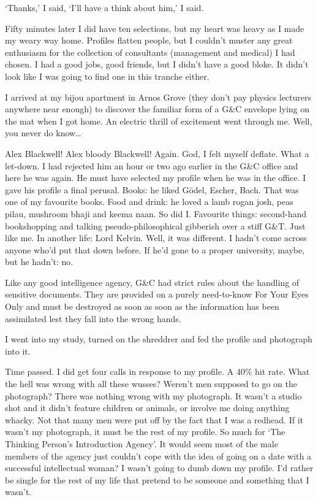 `Thanks,' I said, `I'll have a think about him,' I said.

Fifty minutes later I did have ten selections, but my heart was
heavy as I made my weary way home. Profiles flatten people, but I
couldn't muster any great enthusiasm for the collection of
consultants (management and medical) I had chosen. I had a good jobs,
good friends, but I didn't have a good bloke. It didn't look like I
was going to find one in this tranche either.

I arrived at my bijou apartment in Arnos Grove (they don't pay
physics lecturers anywhere near enough) to discover the familiar
form of a G{\&}C envelope lying on the mat when I got home. An
electric thrill of excitement went through me. Well, you never do
know\dots

Alex Blackwell! Alex bloody Blackwell! Again. God, I felt myself
deflate. What a let-down. I had rejected him an hour or two ago
earlier in the G{\&}C office and here he was again. He must have selected my profile when he was in the office. I gave his
profile a final perusal. Books: he liked {\twelvesl Gödel,
Escher, Bach.}  That was one of my favourite books. Food and drink:
he loved a lamb rogan josh, peas pilau, mushroom bhaji and keema
naan. So did I. Favourite things: second-hand bookshopping and
talking pseudo-philosophical gibberish over a stiff G{\&}T. Just
like me. In another life: Lord Kelvin. Well, it was different. I
hadn't come across anyone who'd put that down before. If he'd gone
to a proper university, maybe, but he hadn't: no.

Like any good intelligence agency, G{\&}C had strict rules about the
handling of sensitive documents. They are provided on a purely
need-to-know For Your Eyes Only and must be destroyed as soon as
soon as the information has been assimilated lest they fall into the
wrong hands.

I went into my study, turned on the shreddrer and fed the profile and photograph
into it.

Time passed. I did get four calls in response to my profile. A 40\%
hit rate. What the hell was wrong with all these wusses? Weren't men
supposed to go on the photograph? There was nothing wrong with
{\twelveit my\/} photograph. It wasn't a studio shot and it didn't
feature children or animals, or involve me doing anything whacky.
Not that many men were put off by the fact that I was a redhead. If
it wasn't my photograph, it must be the rest of my profile. So much
for `The Thinking Person's Introduction Agency'. It would seem most
of the male members of the agency just couldn't cope with the idea
of going on a date with a successful intellectual woman? I wasn't
going to dumb down my profile. I'd rather be single for the rest of
my life that pretend to be someone and something that I wasn't.

